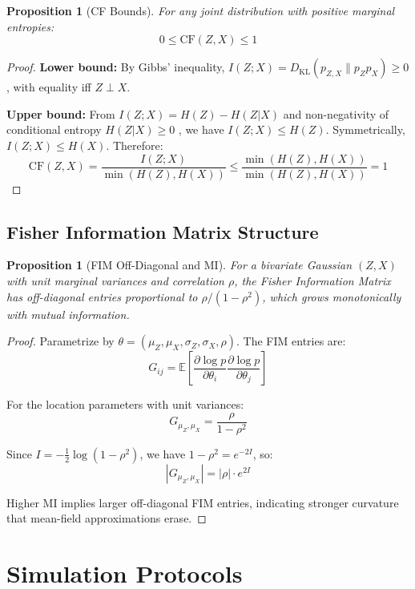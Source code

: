 \documentclass[10pt]{article} %
\theoremstyle{plain}
\newtheorem{proposition}[theorem]{Proposition}
\theoremstyle{definition}
\newcommand{\CF}{\mathrm{CF}}
\newcommand{\MI}{I}
\newcommand{\Ent}{H}
\newcommand{\KL}{D_{\mathrm{KL}}}
\newcommand{\E}{\mathbb{E}}
\begin{document}
\begin{proposition}[CF Bounds]
\label{prop:cf-bounds}
For any joint distribution with positive marginal entropies:
\[
0 \leq \CF(Z, X) \leq 1
\]
\end{proposition}

\begin{proof}
\textbf{Lower bound:} By Gibbs' inequality, $\MI(Z; X) = \KL(p_{Z,X} \| p_Z p_X) \geq 0$, with equality iff $Z \perp X$.

\textbf{Upper bound:} From $\MI(Z; X) = \Ent(Z) - \Ent(Z|X)$ and non-negativity of conditional entropy $\Ent(Z|X) \geq 0$ \citep{cover2006elements}, we have $\MI(Z;X) \leq \Ent(Z)$. Symmetrically, $\MI(Z;X) \leq \Ent(X)$. Therefore:
\[
\CF(Z, X) = \frac{\MI(Z;X)}{\min(\Ent(Z), \Ent(X))} \leq \frac{\min(\Ent(Z), \Ent(X))}{\min(\Ent(Z), \Ent(X))} = 1
\]
\end{proof}

\subsection{Fisher Information Matrix Structure}

\begin{proposition}[FIM Off-Diagonal and MI]
\label{prop:fim-mi}
For a bivariate Gaussian $(Z, X)$ with unit marginal variances and correlation $\rho$, the Fisher Information Matrix has off-diagonal entries proportional to $\rho/(1-\rho^2)$, which grows monotonically with mutual information.
\end{proposition}

\begin{proof}
Parametrize by $\theta = (\mu_Z, \mu_X, \sigma_Z, \sigma_X, \rho)$. The FIM entries are:
\[
G_{ij} = \E\left[\frac{\partial \log p}{\partial \theta_i} \frac{\partial \log p}{\partial \theta_j}\right]
\]

For the location parameters with unit variances:
\[
G_{\mu_Z, \mu_X} = \frac{\rho}{1 - \rho^2}
\]

Since $\MI = -\frac{1}{2}\log(1-\rho^2)$, we have $1-\rho^2 = e^{-2\MI}$, so:
\[
|G_{\mu_Z, \mu_X}| = |\rho| \cdot e^{2\MI}
\]

Higher MI implies larger off-diagonal FIM entries, indicating stronger curvature that mean-field approximations erase.
\end{proof}


\section{Simulation Protocols}
\label{app:protocols}
\end{document}
